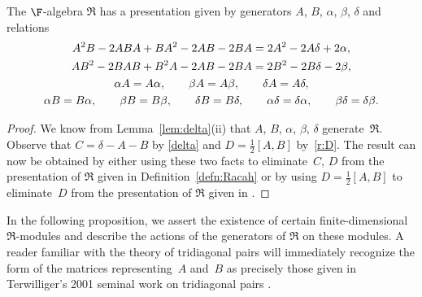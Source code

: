 \begin{Lemma}\label{lem:presentationR}The $\F$-algebra $\Re$ has a presentation given by generators $A$, $B$, $\alpha$, $\beta$, $\delta$ and relations
\begin{gather}
A^2 B-2 A B A+B A^2-2AB-2BA=2A^2-2A\delta +2\alpha,\label{AAB}\\
AB^2-2BAB+B^2 A-2 AB-2 BA= 2B^2-2B\delta-2\beta,\label{ABB}\\
\alpha A = A\alpha, \qquad\beta A = A\beta, \qquad\delta A = A\delta,\notag\\
\alpha B = B\alpha,\qquad\beta B = B\beta,\qquad\delta B = B\delta,\qquad
 \alpha \delta = \delta \alpha,\qquad \beta \delta = \delta \beta. \notag
\end{gather}
\end{Lemma}
\begin{proof}We know from Lemma~\ref{lem:delta}(ii) that $A$, $B$, $\alpha$, $\beta$, $\delta$ generate~$\Re$. Observe that $C=\delta-A-B$ by \eqref{delta} and $D=\frac{1}{2}[A,B]$ by~\eqref{r:D}. The result can now be obtained by either using these two facts to eliminate~$C$, $D$ from the presentation of $\Re$ given in Definition~\ref{defn:Racah} or by using $D=\frac{1}{2}[A,B]$ to eliminate~$D$ from the presentation of $\Re$ given in \cite[Proposition~3.4]{SH:2017-1}.
\end{proof}

In the following proposition, we assert the existence of certain finite-dimensional $\Re$-modules and describe the actions of the generators of $\Re$ on these modules. A reader familiar with the theory of tridiagonal pairs will immediately recognize the form of the matrices representing~$A$ and~$B$ as precisely those given in Terwilliger's 2001 seminal work on tridiagonal pairs \cite[Theorem~3.2]{lp2001}.

